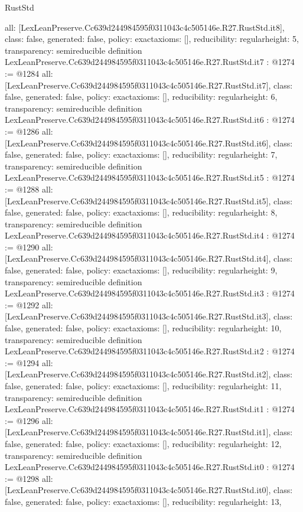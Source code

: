 \begin{lexlean}{RustStd}
\begin{coremodule}
{  all: [LexLeanPreserve.Cc639d244984595f0311043c4c505146e.R27.RustStd.it8],
  class: false,
  generated: false,
  policy: exact{axioms: []},
  reducibility: regular{height: 5},
  transparency: semireducible
}
definition LexLeanPreserve.Cc639d244984595f0311043c4c505146e.R27.RustStd.it7 : @1274 := @1284 {
  all: [LexLeanPreserve.Cc639d244984595f0311043c4c505146e.R27.RustStd.it7],
  class: false,
  generated: false,
  policy: exact{axioms: []},
  reducibility: regular{height: 6},
  transparency: semireducible
}
definition LexLeanPreserve.Cc639d244984595f0311043c4c505146e.R27.RustStd.it6 : @1274 := @1286 {
  all: [LexLeanPreserve.Cc639d244984595f0311043c4c505146e.R27.RustStd.it6],
  class: false,
  generated: false,
  policy: exact{axioms: []},
  reducibility: regular{height: 7},
  transparency: semireducible
}
definition LexLeanPreserve.Cc639d244984595f0311043c4c505146e.R27.RustStd.it5 : @1274 := @1288 {
  all: [LexLeanPreserve.Cc639d244984595f0311043c4c505146e.R27.RustStd.it5],
  class: false,
  generated: false,
  policy: exact{axioms: []},
  reducibility: regular{height: 8},
  transparency: semireducible
}
definition LexLeanPreserve.Cc639d244984595f0311043c4c505146e.R27.RustStd.it4 : @1274 := @1290 {
  all: [LexLeanPreserve.Cc639d244984595f0311043c4c505146e.R27.RustStd.it4],
  class: false,
  generated: false,
  policy: exact{axioms: []},
  reducibility: regular{height: 9},
  transparency: semireducible
}
definition LexLeanPreserve.Cc639d244984595f0311043c4c505146e.R27.RustStd.it3 : @1274 := @1292 {
  all: [LexLeanPreserve.Cc639d244984595f0311043c4c505146e.R27.RustStd.it3],
  class: false,
  generated: false,
  policy: exact{axioms: []},
  reducibility: regular{height: 10},
  transparency: semireducible
}
definition LexLeanPreserve.Cc639d244984595f0311043c4c505146e.R27.RustStd.it2 : @1274 := @1294 {
  all: [LexLeanPreserve.Cc639d244984595f0311043c4c505146e.R27.RustStd.it2],
  class: false,
  generated: false,
  policy: exact{axioms: []},
  reducibility: regular{height: 11},
  transparency: semireducible
}
definition LexLeanPreserve.Cc639d244984595f0311043c4c505146e.R27.RustStd.it1 : @1274 := @1296 {
  all: [LexLeanPreserve.Cc639d244984595f0311043c4c505146e.R27.RustStd.it1],
  class: false,
  generated: false,
  policy: exact{axioms: []},
  reducibility: regular{height: 12},
  transparency: semireducible
}
definition LexLeanPreserve.Cc639d244984595f0311043c4c505146e.R27.RustStd.it0 : @1274 := @1298 {
  all: [LexLeanPreserve.Cc639d244984595f0311043c4c505146e.R27.RustStd.it0],
  class: false,
  generated: false,
  policy: exact{axioms: []},
  reducibility: regular{height: 13},
}
\end{coremodule}
\end{lexlean}
